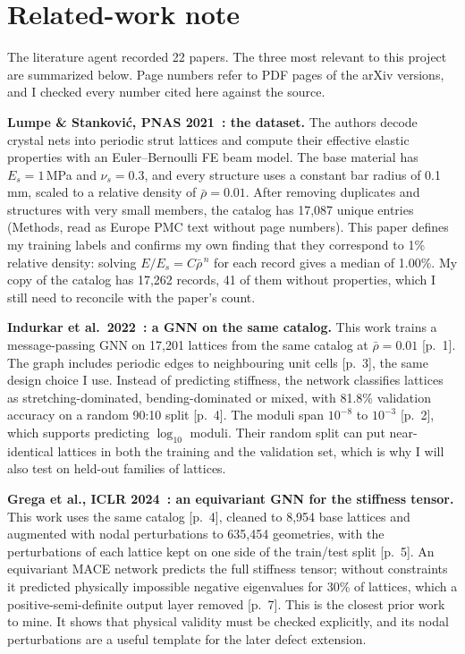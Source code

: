 \documentclass[11pt]{article}
\newcommand{\rhob}{\bar{\rho}}
\begin{document}
\section{Related-work note}\label{sec:rw}

The literature agent recorded 22 papers. The three most relevant to this project are summarized
below. Page numbers refer to PDF pages of the arXiv versions, and I checked every number cited here
against the source.

\textbf{Lumpe \& Stankovi\'c, PNAS 2021~\cite{lumpe}: the dataset.} The authors decode crystal nets
into periodic strut lattices and compute their effective elastic properties with an
Euler--Bernoulli FE beam model. The base material has $E_s = 1$\,MPa and $\nu_s = 0.3$, and every
structure uses a constant bar radius of 0.1\,mm, scaled to a relative density of $\rhob = 0.01$.
After removing duplicates and structures with very small members, the catalog has 17,087 unique
entries (Methods, read as Europe PMC text without page numbers). This paper defines my training
labels and confirms my own finding that they correspond to 1\% relative density: solving
$E/E_s = C\rhob^{\,n}$ for each record gives a median of 1.00\%. My copy of the catalog has 17,262
records, 41 of them without properties, which I still need to reconcile with the paper's count.

\textbf{Indurkar et al.\ 2022~\cite{indurkar}: a GNN on the same catalog.} This work trains a
message-passing GNN on 17,201 lattices from the same catalog at $\rhob = 0.01$ [p.~1]. The graph
includes periodic edges to neighbouring unit cells [p.~3], the same design choice I use. Instead of
predicting stiffness, the network classifies lattices as stretching-dominated, bending-dominated or
mixed, with 81.8\% validation accuracy on a random 90:10 split [p.~4]. The moduli span $10^{-8}$ to
$10^{-3}$ [p.~2], which supports predicting $\log_{10}$ moduli. Their random split can put
near-identical lattices in both the training and the validation set, which is why I will also test
on held-out families of lattices.

\textbf{Grega et al., ICLR 2024~\cite{grega}: an equivariant GNN for the stiffness tensor.} This
work uses the same catalog [p.~4], cleaned to 8,954 base lattices and augmented with nodal
perturbations to 635,454 geometries, with the perturbations of each lattice kept on one side of the
train/test split [p.~5]. An equivariant MACE network predicts the full stiffness tensor; without
constraints it predicted physically impossible negative eigenvalues for 30\% of lattices, which a
positive-semi-definite output layer removed [p.~7]. This is the closest prior work to mine. It shows
that physical validity must be checked explicitly, and its nodal perturbations are a useful
template for the later defect extension.
\end{document}
